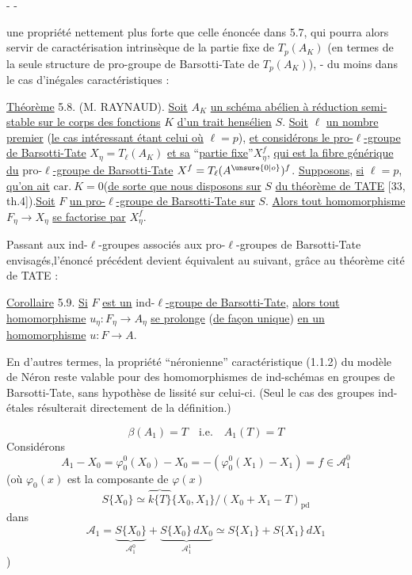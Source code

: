 \begin{center}-  -\end{center}

une propriété nettement plus forte que celle énoncée dans 5.7, qui pourra alors servir de caractérisation intrinsèque de la partie fixe de $T_p(A_K)$ (en termes de la seule structure de pro-groupe de Barsotti-Tate de $T_p(A_K)$), - du moins dans le cas d'inégales caractéristiques :

\uline{Théorème} 5.8. (M. RAYNAUD). \uline{Soit} $A_K$ \uline{un schéma abélien à réduction semi-stable sur le corps des fonctions} $K$ \uline{d'un trait hensélien} $S$. \uline{Soit} $\ell$ \uline{un nombre premier} (\uline{le cas intéressant étant celui où} $\ell=p$), \uline{et considérons le pro-}$\ell$\uline{-groupe de Barsotti-Tate} $X_\eta=T_\ell(A_K)$ \uline{et sa} ``\uline{partie fixe}''$X_\eta^f$, \uline{qui est la fibre générique du} pro-$\ell$\uline{-groupe de Barsotti-Tate} $X^f=T_\ell(A^{\unsure{0|o}})^f$. \uline{Supposons}, \uline{si} $\ell=p$, \uline{qu'on ait} $\mathrm{car.}\ K=0$(\uline{de sorte que nous disposons sur} $S$ \uline{du théorème de TATE} [33, th.4]).\uline{Soit} $F$ \uline{un pro-}$\ell$\uline{-groupe de Barsotti-Tate sur} $S$. \uline{Alors tout homomorphisme} $F_\eta\longrightarrow X_\eta$ \uline{se factorise par} $X_\eta^f$.

Passant aux ind-$\ell$-groupes associés aux pro-$\ell$-groupes de Barsotti-Tate envisagés,l'énoncé précédent devient équivalent au suivant, grâce au théorème cité de TATE :

\uline{Corollaire} 5.9. \uline{Si} $F$ \uline{est un} ind-$\ell$\uline{-groupe de Barsotti-Tate}, \uline{alors tout homomorphisme} $u_\eta:F_\eta\longrightarrow A_\eta$ \uline{se prolonge} (\uline{de façon unique}) \uline{en un homomorphisme} $u:F\longrightarrow A$.

En d'autres termes, la propriété ``néronienne'' caractéristique (1.1.2) du modèle de Néron reste valable pour des homomorphismes de ind-schémas en groupes de Barsotti-Tate, sans hypothèse de lissité sur celui-ci. (Seul le cas des groupes ind-étales résulterait directement de la définition.)


\[
\boxed{\boxed{\beta(A_1)=T}}\quad\text{i.e.}\quad A_1(T)=T
\]
 Considérons
\[
A_1-X_0=\varphi_0^0(X_0)-X_0=-(\varphi_0^0(X_1)-X_1)=f\in\mathcal A_1^0
\]
(où $\varphi_0(x)$ est la composante de $\varphi(x)$ 
\[
S\{X_0\}\simeq\overbrace{k\{T\}}\{X_0,X_1\}/(X_0+X_1-T)_{\mathrm{pd}}
\]
dans
\[
\mathcal A_1=\underbrace{S\{X_0\}}_{\mathcal A_1^0}+\underbrace{S\{X_0\}\,dX_0}_{\mathcal A_1^1}\simeq S\{X_1\}+S\{X_1\}\,dX_1
\]
)

